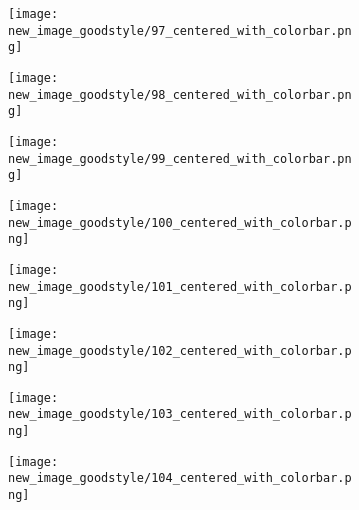 \documentclass[a4paper,12pt]{article}
\begin{document}
\begin{figure}[H]
  \begin{subfigure}{0.11\textwidth}
    \texttt{[image: new\_image\_goodstyle/97\_centered\_with\_colorbar.png]}
  \end{subfigure}
  \hfill
  \begin{subfigure}{0.11\textwidth}
    \texttt{[image: new\_image\_goodstyle/98\_centered\_with\_colorbar.png]}
  \end{subfigure}
  \hfill
  \begin{subfigure}{0.11\textwidth}
    \texttt{[image: new\_image\_goodstyle/99\_centered\_with\_colorbar.png]}
  \end{subfigure}
  \hfill
  \begin{subfigure}{0.11\textwidth}
    \texttt{[image: new\_image\_goodstyle/100\_centered\_with\_colorbar.png]}
  \end{subfigure}
  \hfill
  \begin{subfigure}{0.11\textwidth}
    \texttt{[image: new\_image\_goodstyle/101\_centered\_with\_colorbar.png]}
  \end{subfigure}
  \hfill
  \begin{subfigure}{0.11\textwidth}
    \texttt{[image: new\_image\_goodstyle/102\_centered\_with\_colorbar.png]}
  \end{subfigure}
  \hfill
  \begin{subfigure}{0.11\textwidth}
    \texttt{[image: new\_image\_goodstyle/103\_centered\_with\_colorbar.png]}
  \end{subfigure}
  \hfill
  \begin{subfigure}{0.11\textwidth}
    \texttt{[image: new\_image\_goodstyle/104\_centered\_with\_colorbar.png]}
  \end{subfigure}
  \hfill
\end{figure}
\end{document}
